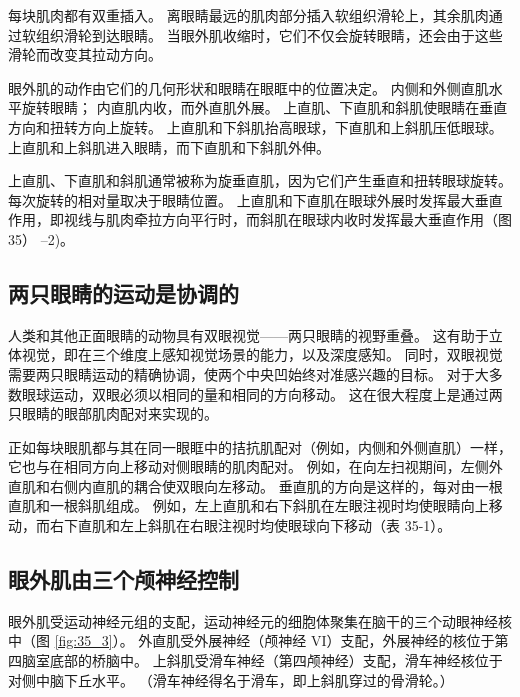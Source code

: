 每块肌肉都有双重插入。
离眼睛最远的肌肉部分插入软组织滑轮上，其余肌肉通过软组织滑轮到达眼睛。
当眼外肌收缩时，它们不仅会旋转眼睛，还会由于这些滑轮而改变其拉动方向。


眼外肌的动作由它们的几何形状和眼睛在眼眶中的位置决定。
内侧和外侧直肌水平旋转眼睛；
内直肌内收，而外直肌外展。
上直肌、下直肌和斜肌使眼睛在垂直方向和扭转方向上旋转。
上直肌和下斜肌抬高眼球，下直肌和上斜肌压低眼球。
上直肌和上斜肌进入眼睛，而下直肌和下斜肌外伸。


上直肌、下直肌和斜肌通常被称为旋垂直肌，因为它们产生垂直和扭转眼球旋转。
每次旋转的相对量取决于眼睛位置。
上直肌和下直肌在眼球外展时发挥最大垂直作用，即视线与肌肉牵拉方向平行时，而斜肌在眼球内收时发挥最大垂直作用（图 35） –2)。



\subsection{两只眼睛的运动是协调的}

人类和其他正面眼睛的动物具有双眼视觉——两只眼睛的视野重叠。
这有助于立体视觉，即在三个维度上感知视觉场景的能力，以及深度感知。
同时，双眼视觉需要两只眼睛运动的精确协调，使两个中央凹始终对准感兴趣的目标。
对于大多数眼球运动，双眼必须以相同的量和相同的方向移动。 
这在很大程度上是通过两只眼睛的眼部肌肉配对来实现的。


正如每块眼肌都与其在同一眼眶中的拮抗肌配对（例如，内侧和外侧直肌）一样，它也与在相同方向上移动对侧眼睛的肌肉配对。
例如，在向左扫视期间，左侧外直肌和右侧内直肌的耦合使双眼向左移动。
垂直肌的方向是这样的，每对由一根直肌和一根斜肌组成。
例如，左上直肌和右下斜肌在左眼注视时均使眼睛向上移动，而右下直肌和左上斜肌在右眼注视时均使眼球向下移动（表 35-1）。



\subsection{眼外肌由三个颅神经控制}

眼外肌受运动神经元组的支配，运动神经元的细胞体聚集在脑干的三个动眼神经核中（图 \ref{fig:35_3}）。 
外直肌受外展神经（颅神经 VI）支配，外展神经的核位于第四脑室底部的桥脑中。
上斜肌受滑车神经（第四颅神经）支配，滑车神经核位于对侧中脑下丘水平。
（滑车神经得名于滑车，即上斜肌穿过的骨滑轮。）


